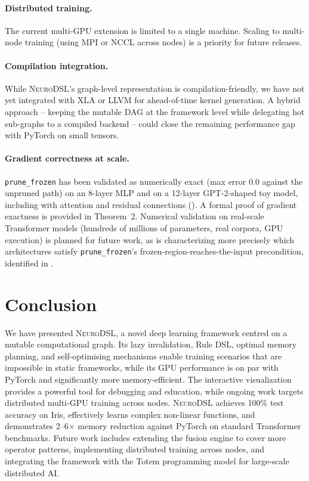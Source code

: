 \documentclass{article}
\begin{document}
\paragraph{Distributed training.} The current multi-GPU extension is limited to a single machine. Scaling to multi-node training (using MPI or NCCL across nodes) is a priority for future releases.

\paragraph{Compilation integration.} While \textsc{NeuroDSL}'s graph-level representation is compilation-friendly, we have not yet integrated with XLA or LLVM for ahead-of-time kernel generation. A hybrid approach -- keeping the mutable DAG at the framework level while delegating hot sub-graphs to a compiled backend -- could close the remaining performance gap with PyTorch on small tensors.

\paragraph{Gradient correctness at scale.} \texttt{prune\_frozen} has been validated as numerically exact (max error $0.0$ against the unpruned path) on an 8-layer MLP and on a 12-layer GPT-2-shaped toy model, including with attention and residual connections (). A formal proof of gradient exactness is provided in Theorem~2. Numerical validation on real-scale Transformer models (hundreds of millions of parameters, real corpora, GPU execution) is planned for future work, as is characterizing more precisely which architectures satisfy \texttt{prune\_frozen}'s frozen-region-reaches-the-input precondition, identified in .

\section{Conclusion}
\label{sec:conclusion}

We have presented \textsc{NeuroDSL}, a novel deep learning framework centred on a mutable computational graph. Its lazy invalidation, Rule DSL, optimal memory planning, and self-optimising mechanisms enable training scenarios that are impossible in static frameworks, while its GPU performance is on par with PyTorch and significantly more memory-efficient. The interactive visualization provides a powerful tool for debugging and education, while ongoing work targets distributed multi‑GPU training across nodes. \textsc{NeuroDSL} achieves 100\% test accuracy on Iris, effectively learns complex non-linear functions, and demonstrates 2--6$\times$ memory reduction against PyTorch on standard Transformer benchmarks. Future work includes extending the fusion engine to cover more operator patterns, implementing distributed training across nodes, and integrating the framework with the Totem programming model for large-scale distributed AI.
\end{document}
